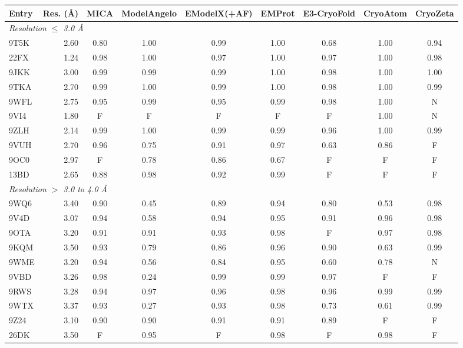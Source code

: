 \begin{tabular}{lrccccccc}
\toprule
Entry & Res. (\AA) & MICA & ModelAngelo & EModelX(+AF) & EMProt & E3-CryoFold & CryoAtom & CryoZeta \\
\midrule
\multicolumn{9}{l}{\emph{Resolution $\leq$ 3.0 \AA}} \\
9T5K & 2.60 & 0.80 & 1.00 & 0.99 & 1.00 & 0.68 & 1.00 & 0.94 \\
22FX & 1.24 & 0.98 & 1.00 & 0.97 & 1.00 & 0.97 & 1.00 & 0.98 \\
9JKK & 3.00 & 0.99 & 0.99 & 0.99 & 1.00 & 0.98 & 1.00 & 1.00 \\
9TKA & 2.70 & 0.99 & 1.00 & 0.99 & 1.00 & 0.98 & 1.00 & 0.99 \\
9WFL & 2.75 & 0.95 & 0.99 & 0.95 & 0.99 & 0.98 & 1.00 & N \\
9VI4 & 1.80 & F & F & F & F & F & 1.00 & N \\
9ZLH & 2.14 & 0.99 & 1.00 & 0.99 & 0.99 & 0.96 & 1.00 & 0.99 \\
9VUH & 2.70 & 0.96 & 0.75 & 0.91 & 0.97 & 0.63 & 0.86 & F \\
9OC0 & 2.97 & F & 0.78 & 0.86 & 0.67 & F & F & F \\
13BD & 2.65 & 0.88 & 0.98 & 0.92 & 0.99 & F & F & F \\
\midrule
\multicolumn{9}{l}{\emph{Resolution $>$ 3.0 to 4.0 \AA}} \\
9WQ6 & 3.40 & 0.90 & 0.45 & 0.89 & 0.94 & 0.80 & 0.53 & 0.98 \\
9V4D & 3.07 & 0.94 & 0.58 & 0.94 & 0.95 & 0.91 & 0.96 & 0.98 \\
9OTA & 3.20 & 0.91 & 0.91 & 0.93 & 0.98 & F & 0.97 & 0.98 \\
9KQM & 3.50 & 0.93 & 0.79 & 0.86 & 0.96 & 0.90 & 0.63 & 0.99 \\
9WME & 3.20 & 0.94 & 0.56 & 0.84 & 0.95 & 0.60 & 0.78 & N \\
9VBD & 3.26 & 0.98 & 0.24 & 0.99 & 0.99 & 0.97 & F & F \\
9RWS & 3.28 & 0.94 & 0.97 & 0.96 & 0.98 & 0.96 & 0.99 & 0.99 \\
9WTX & 3.37 & 0.93 & 0.27 & 0.93 & 0.98 & 0.73 & 0.61 & 0.99 \\
9Z24 & 3.10 & 0.90 & 0.90 & 0.91 & 0.91 & 0.89 & F & F \\
26DK & 3.50 & F & 0.95 & F & 0.98 & F & 0.98 & F \\
\bottomrule
\end{tabular}
